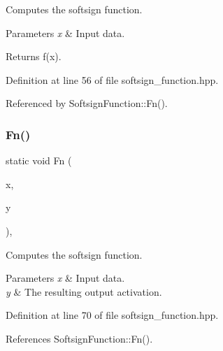 Computes the softsign function. 


\begin{DoxyParams}{Parameters}
{\em x} & Input data. \\
\hline
\end{DoxyParams}
\begin{DoxyReturn}{Returns}
f(x). 
\end{DoxyReturn}


Definition at line 56 of file softsign\+\_\+function.\+hpp.



Referenced by Softsign\+Function\+::\+Fn().

\mbox{\label{classmlpack_1_1ann_1_1SoftsignFunction_af6cf5da90eb6312e3e25c9b8bd9c3527}} 
\subsubsection{Fn()\hspace{0.1cm}{\footnotesize\ttfamily [2/2]}}
{\footnotesize\ttfamily static void Fn (\begin{DoxyParamCaption}\item[{const Input\+Vec\+Type \&}]{x,  }\item[{Output\+Vec\+Type \&}]{y }\end{DoxyParamCaption})\hspace{0.3cm}{\ttfamily [inline]}, {\ttfamily [static]}}



Computes the softsign function. 


\begin{DoxyParams}{Parameters}
{\em x} & Input data. \\
\hline
{\em y} & The resulting output activation. \\
\hline
\end{DoxyParams}


Definition at line 70 of file softsign\+\_\+function.\+hpp.



References Softsign\+Function\+::\+Fn().

\mbox{\label{classmlpack_1_1ann_1_1SoftsignFunction_a32d503b167c9646569a202e8c134ef76}} 
